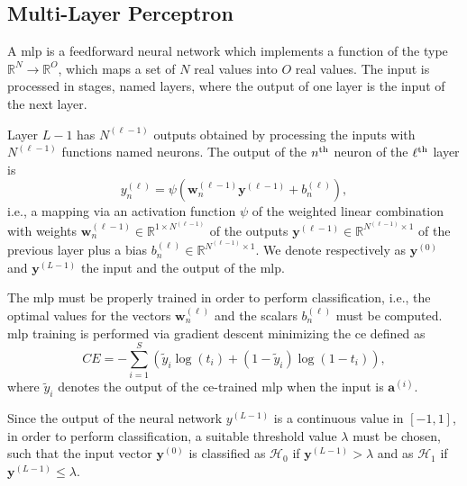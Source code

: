 \documentclass[twocolumns]{IEEEtran}
\begin{document}
\subsection{Multi-Layer Perceptron}\label{sec:nn}

A \ac{mlp} is a feedforward neural network which implements a function of the type $\mathbb{R}^N \to \mathbb{R}^O$, which maps a set of $N$ real values into $O$ real values. The input is processed in stages, named layers, where the output of one layer is the input of the next layer.

Layer $L-1$ has $N^{(\ell-1)}$ outputs obtained by processing the inputs with $N^{(\ell-1)}$ functions named neurons. The output of the $n^{\rm th}$ neuron of the $\ell^{\rm th}$ layer is
\begin{equation}\label{eq:nonLin}
y_n^{(\ell)} = \psi\left( \bm{w}_n^{(\ell -1)}\bm{y}^{(\ell-1)}+b_n^{(\ell)} \right),
\end{equation}
i.e., a mapping via an activation function $\psi$ of the weighted linear combination with weights $\bm{w}_n^{(\ell -1)}\in \mathbb{R}^{1\times N^{(\ell-1)}}$ of the outputs $\bm{y}^{(\ell-1)} \in \mathbb{R}^{N^{(\ell-1)} \times 1 }$ of the previous layer plus a bias $b_n^{(\ell)} \in \mathbb{R}^{N^{(\ell-1)} \times 1 }$. We denote respectively as $\bm{y}^{(0)}$ and $\bm{y}^{(L-1)}$ the input and the output of the \ac{mlp}. 

The \ac{mlp} must be properly trained in order to perform classification, i.e., the optimal values for the vectors $\bm{w}_n^{(\ell)}$ and the scalars $b_n^{(\ell)}$ must be computed. \Ac{mlp} training is performed via gradient descent minimizing the \ac{ce} defined as
\begin{equation}\label{eq:ce}
CE = -\sum_{i=1}^{S}\left(\tilde{y}_i\log\left(t_i\right)+\left(1-\tilde{y}_i\right)\log\left(1-t_i\right) \right),
\end{equation}
where $\tilde{y}_i$ denotes the output of the \ac{ce}-trained \ac {mlp} when the input is $\bm{a}^{(i)}$.

Since the output of the neural network $y^{(L-1)}$ is a continuous value in $[-1,1]$, in order to perform classification, a suitable threshold value $\lambda$ must be chosen, such that the input vector $\bm{y}^{(0)}$ is classified as
$\mathcal{H}_0$ if $\bm{y}^{(L-1)} > \lambda$ and as $\mathcal{H}_1$ if $\bm{y}^{(L-1)} \le \lambda$.
\end{document}
